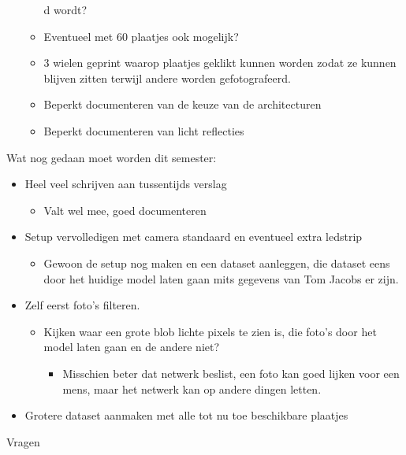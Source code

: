 \documentclass{article}
\begin{document}
\begin{itemize}
\begin{itemize}
d wordt? 
	\item Eventueel met 60 plaatjes ook mogelijk?
	\item 3 wielen geprint waarop plaatjes geklikt kunnen worden zodat ze kunnen blijven zitten terwijl andere worden gefotografeerd.
	\item Beperkt documenteren van de keuze van de architecturen
	\item Beperkt documenteren van licht reflecties
	\end{itemize}
\end{itemize}


Wat nog gedaan moet worden dit semester:

	\begin{itemize}
	\item Heel veel schrijven aan tussentijds verslag
		\begin{itemize}
		\item Valt wel mee, goed documenteren
		\end{itemize}
	\item Setup vervolledigen met camera standaard en eventueel extra ledstrip
		\begin{itemize}
		\item Gewoon de setup nog maken en een dataset aanleggen, die dataset eens door het huidige model laten gaan mits gegevens van Tom Jacobs er zijn.
		\end{itemize}
	\item Zelf eerst foto’s filteren.
		\begin{itemize}
		\item Kijken waar een grote blob lichte pixels te zien is, die foto’s door het model laten gaan en de andere niet?
			\begin{itemize}
			\item Misschien beter dat netwerk beslist, een foto kan goed lijken voor een mens, maar het netwerk kan op andere dingen letten.
			\end{itemize}
		\end{itemize}
	\item Grotere dataset aanmaken met alle tot nu toe beschikbare plaatjes
	\end{itemize}




Vragen
\end{document}
